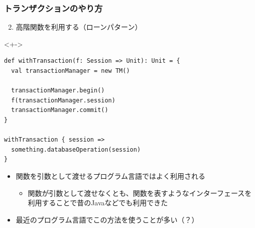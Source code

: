 \begin{frame}[fragile]
  \frametitle{トランザクションのやり方}

  \pause
  \begin{enumerate}
    \setcounter{enumi}{1}
    \item<+-> \label{enum:loan} 高階関数を利用する（ローンパターン）
  \end{enumerate}

  \begin{uncoverenv}<+->
\begin{lstlisting}[style=scala]
def withTransaction(f: Session => Unit): Unit = {
  val transactionManager = new TM()

  transactionManager.begin()
  f(transactionManager.session)
  transactionManager.commit()
}

withTransaction { session =>
  something.databaseOperation(session)
}
\end{lstlisting}
  \end{uncoverenv}

  \begin{itemize}
    \item<+-> 関数を引数として渡せるプログラム言語ではよく利用される
    \begin{itemize}
      \item<+-> 関数が引数として渡せなくとも、関数を表すようなインターフェースを
      利用することで昔のJavaなどでも利用できた
    \end{itemize}
      
    \item<+-> 最近のプログラム言語でこの方法を使うことが多い（？）
  \end{itemize}
\end{frame}


